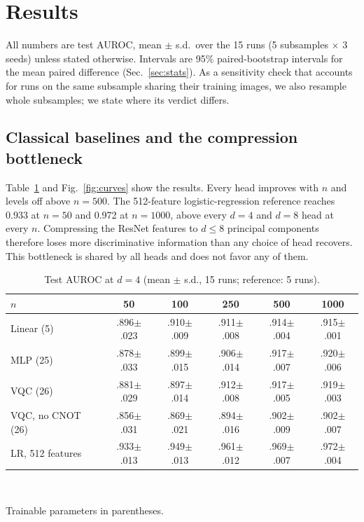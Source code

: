 \documentclass[conference]{IEEEtran}
\begin{document}
\section{Results}
\label{sec:results}
All numbers are test AUROC, mean $\pm$ s.d.\ over the 15 runs
(5 subsamples $\times$ 3 seeds) unless stated otherwise. Intervals are 95\%
paired-bootstrap intervals for the mean paired difference
(Sec.~\ref{sec:stats}). As a sensitivity check that accounts for runs on
the same subsample sharing their training images, we also resample whole
subsamples; we state where its verdict differs.

\subsection{Classical baselines and the compression bottleneck}
Table~\ref{tab:auroc4} and Fig.~\ref{fig:curves} show the results. Every
head improves with $n$ and levels off above $n=500$. The 512-feature
logistic-regression reference reaches 0.933 at $n=50$ and 0.972 at
$n=1000$, above every $d=4$ and $d=8$ head at every $n$. Compressing the
ResNet features to $d\le8$ principal components therefore loses more
discriminative information than any choice of head recovers. This
bottleneck is shared by all heads and does not favor any of them.

\begin{table}[t]
\centering
\caption{Test AUROC at $d=4$ (mean $\pm$ s.d., 15 runs; reference: 5 runs).}
\label{tab:auroc4}
\footnotesize
\setlength{\tabcolsep}{3pt}
\begin{tabular}{@{}lccccc@{}}
\toprule
$n$ & 50 & 100 & 250 & 500 & 1000 \\
\midrule
Linear (5)        & .896$\pm$.023 & .910$\pm$.009 & .911$\pm$.008 & .914$\pm$.004 & .915$\pm$.001 \\
MLP (25)          & .878$\pm$.033 & .899$\pm$.015 & .906$\pm$.014 & .917$\pm$.007 & .920$\pm$.006 \\
VQC (26)          & .881$\pm$.029 & .897$\pm$.014 & .912$\pm$.008 & .917$\pm$.005 & .919$\pm$.003 \\
VQC, no CNOT (26) & .856$\pm$.031 & .869$\pm$.021 & .894$\pm$.016 & .902$\pm$.009 & .902$\pm$.007 \\
\midrule
LR, 512 features  & .933$\pm$.013 & .949$\pm$.013 & .961$\pm$.012 & .969$\pm$.007 & .972$\pm$.004 \\
\bottomrule
\end{tabular}\\[2pt]
\raggedright\scriptsize Trainable parameters in parentheses.
\end{table}
\end{document}
